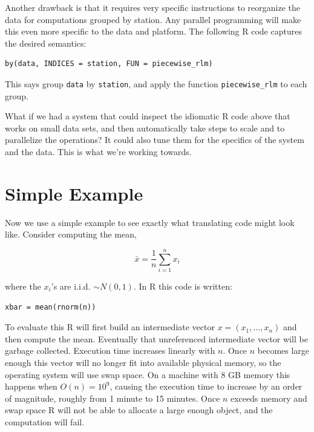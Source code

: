 \documentclass[12pt]{article}
\begin{document}
Another drawback is that it requires very specific instructions to
reorganize the data for computations grouped by station. Any parallel
programming will make this even more specific to the data and platform. The
following R code captures the desired semantics:

\begin{verbatim}
by(data, INDICES = station, FUN = piecewise_rlm)
\end{verbatim}

This says group \texttt{data} by \texttt{station}, and apply the
function \texttt{piecewise\_rlm} to each group.

What if we had a system that could inspect the idiomatic R code above that
works on small data sets, and then automatically take steps to scale and to
parallelize the operations? It could also tune them for the specifics of
the system and the data. This is what we're working towards.


\section{Simple Example}


Now we use a simple example to see exactly what translating code might look
like.  Consider computing the mean,

\begin{equation}
    \bar{x} = \frac{1}{n} \sum_{i = 1}^n x_i
\label{eq:mean}
\end{equation}

where the $x_i$'s are
i.i.d. $\sim N(0, 1)$.  In R this code is written:

\begin{verbatim}
xbar = mean(rnorm(n))
\end{verbatim}

To evaluate this R will first build an intermediate vector $x = (x_1,
\dots, x_n)$ and then compute the mean. Eventually that unreferenced
intermediate vector will be garbage collected.
Execution time increases
linearly with $n$. Once $n$ becomes large
enough this vector will no longer fit into available physical memory, so
the operating system will use swap space. On a machine with 8 GB memory
this happens when $O(n) = 10^9$, causing the execution time
to increase by an order of magnitude, roughly from 1 minute to 15
minutes. Once $n$ exceeds memory and swap space R will not be able to allocate a
large enough object, and the computation will fail.
\end{document}
